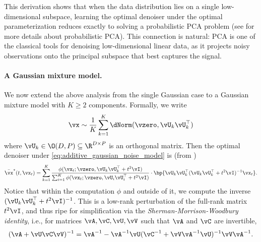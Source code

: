 \documentclass[../../book-main.tex]{subfiles}
\begin{document}
{This derivation shows that when the data distribution lies on a single low-dimensional subspace, learning the optimal denoiser under the optimal parameterization reduces exactly to solving a probabilistic PCA problem (see  for more details about probabilistic PCA). This connection is natural: PCA is one of the classical tools for denoising low-dimensional linear data, as it projects noisy observations onto the principal subspace that best captures the signal. %



\paragraph{A Gaussian mixture model.} %
We now extend the above analysis from the single Gaussian case to a Gaussian mixture model with $K\ge 2$ components. Formally, we write 
\begin{equation}\label{eq:MoG1}
	\vx \sim \frac{1}{K}\sum_{k = 1}^{K}\dNorm(\vzero, \vU_{k}\vU_{k}^{\top})
\end{equation}
where \(\vU_{k} \in \O(D, P) \subseteq \R^{D \times P}\) is an orthogonal matrix. Then the optimal denoiser under \eqref{eq:additive_gaussian_noise_model} is (from )
\begin{equation}
	\bar{\vx}^{\ast}(t, \vx_{t}) = \sum_{k = 1}^{K}\frac{\phi(\vx_{t} ; \vzero,
	\vU_{k}\vU_{k}^{\top} + t^{2}\vI)}{\sum_{i = 1}^{K}\phi(\vx_{t} ; \vzero, \vU_{i}\vU_{i}^{\top} + t^{2}\vI)}\cdot\bp{\vU_{k}\vU_{k}^{\top}(\vU_{k}\vU_{k}^{\top} + t^{2}\vI)^{-1}\vx_{t}}.
\end{equation}
Notice that within the computation \(\phi\) and outside of it, we compute the inverse \((\vU_{k}\vU_{k}^{\top} + t^{2}\vI)^{-1}\). This is a low-rank perturbation of the full-rank matrix \(t^{2}\vI\), and thus ripe for simplification via the \textit{Sherman-Morrison-Woodbury identity}, i.e., for matrices \(\vA, \vC, \vU, \vV\) such that \(\vA\) and \(\vC\) are invertible,
\begin{equation}\label{eq:sherman_morrison_woodbury}
	(\vA + \vU\vC\vV)^{-1} = \vA^{-1} - \vA^{-1}\vU(\vC^{-1} + \vV\vA^{-1}\vU)^{-1}\vV\vA^{-1}.

\end{equation}}
\end{document}
